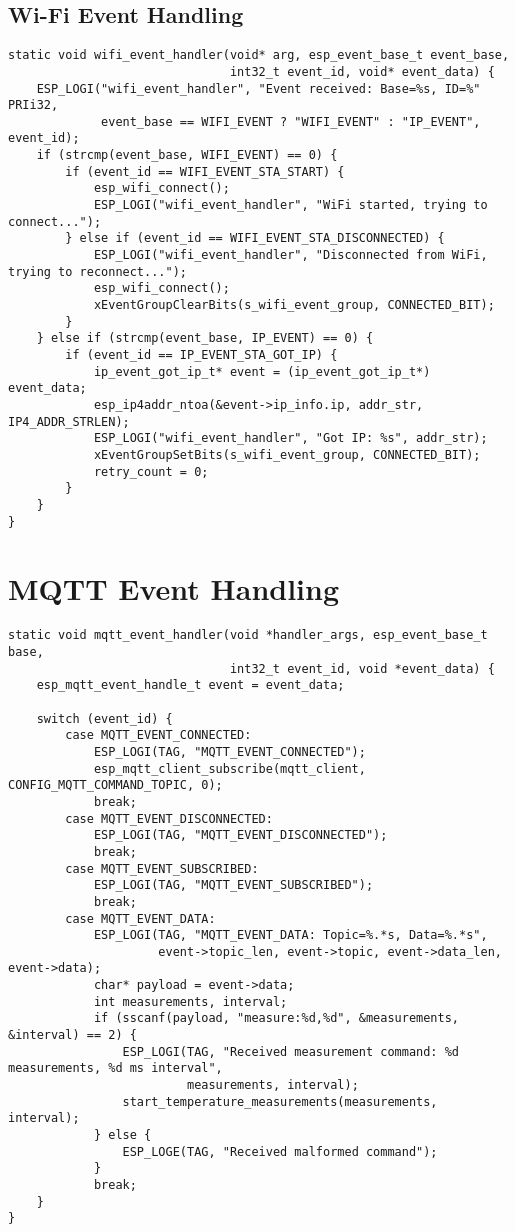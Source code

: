 \documentclass[
  article,
  10pt,
  a4paper,
  oneside,
  openany,
  twocolumn
]{memoir}
\begin{document}
\subsection*{Wi-Fi Event Handling}
\begin{verbatim}
static void wifi_event_handler(void* arg, esp_event_base_t event_base, 
                               int32_t event_id, void* event_data) {
    ESP_LOGI("wifi_event_handler", "Event received: Base=%s, ID=%" PRIi32, 
             event_base == WIFI_EVENT ? "WIFI_EVENT" : "IP_EVENT", event_id);
    if (strcmp(event_base, WIFI_EVENT) == 0) {
        if (event_id == WIFI_EVENT_STA_START) {
            esp_wifi_connect();
            ESP_LOGI("wifi_event_handler", "WiFi started, trying to connect...");
        } else if (event_id == WIFI_EVENT_STA_DISCONNECTED) {
            ESP_LOGI("wifi_event_handler", "Disconnected from WiFi, trying to reconnect...");
            esp_wifi_connect();
            xEventGroupClearBits(s_wifi_event_group, CONNECTED_BIT);
        }
    } else if (strcmp(event_base, IP_EVENT) == 0) {
        if (event_id == IP_EVENT_STA_GOT_IP) {
            ip_event_got_ip_t* event = (ip_event_got_ip_t*) event_data;
            esp_ip4addr_ntoa(&event->ip_info.ip, addr_str, IP4_ADDR_STRLEN);
            ESP_LOGI("wifi_event_handler", "Got IP: %s", addr_str);
            xEventGroupSetBits(s_wifi_event_group, CONNECTED_BIT);
            retry_count = 0;
        }
    }
}
\end{verbatim}

\section*{MQTT Event Handling}

\begin{verbatim}
static void mqtt_event_handler(void *handler_args, esp_event_base_t base, 
                               int32_t event_id, void *event_data) {
    esp_mqtt_event_handle_t event = event_data; 
    
    switch (event_id) {
        case MQTT_EVENT_CONNECTED:
            ESP_LOGI(TAG, "MQTT_EVENT_CONNECTED");
            esp_mqtt_client_subscribe(mqtt_client, CONFIG_MQTT_COMMAND_TOPIC, 0);
            break;
        case MQTT_EVENT_DISCONNECTED:
            ESP_LOGI(TAG, "MQTT_EVENT_DISCONNECTED");
            break;
        case MQTT_EVENT_SUBSCRIBED:
            ESP_LOGI(TAG, "MQTT_EVENT_SUBSCRIBED");
            break;
        case MQTT_EVENT_DATA:
            ESP_LOGI(TAG, "MQTT_EVENT_DATA: Topic=%.*s, Data=%.*s", 
                     event->topic_len, event->topic, event->data_len, event->data);
            char* payload = event->data;
            int measurements, interval;
            if (sscanf(payload, "measure:%d,%d", &measurements, &interval) == 2) {
                ESP_LOGI(TAG, "Received measurement command: %d measurements, %d ms interval", 
                         measurements, interval);
                start_temperature_measurements(measurements, interval);
            } else {
                ESP_LOGE(TAG, "Received malformed command");
            }
            break;
    }
}
\end{verbatim}
\end{document}
